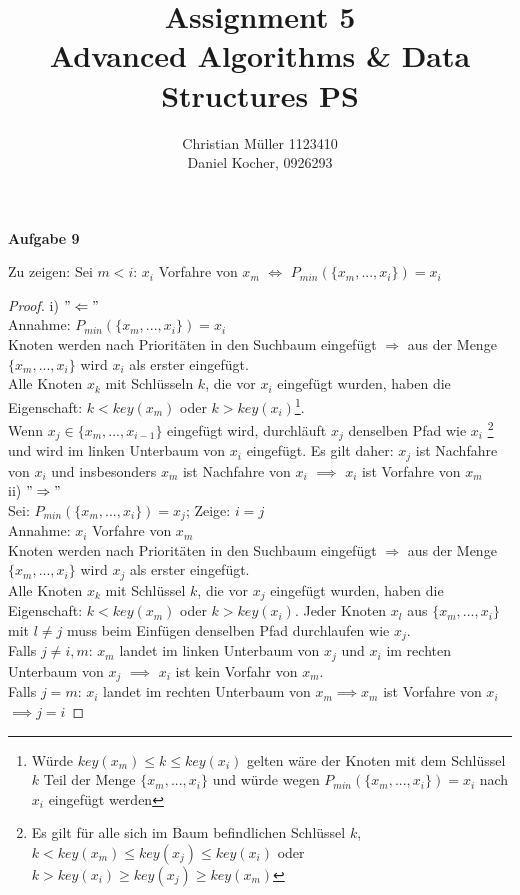 \documentclass{article}
\begin{document}
\title{Assignment 5 \\ Advanced Algorithms \& Data Structures PS}%
\author{Christian Müller 1123410 \\ Daniel Kocher, 0926293}%
\maketitle

{\noindent\bfseries Aufgabe 9}%
\medskip%

Zu zeigen: Sei $m < i$: $x_{i}$ Vorfahre von $x_{m}$ $\Leftrightarrow$ $P_{min}(\lbrace x_{m},...,x_{i} \rbrace)=x_{i}$ \\

\begin{proof}
\noindent

\noindent
i) $"\Leftarrow"$\\
Annahme: $P_{min}(\lbrace x_{m},...,x_{i} \rbrace)=x_{i}$\\
Knoten werden nach Prioritäten in den Suchbaum eingefügt $\Rightarrow$ aus der Menge $\lbrace x_{m},...,x_{i} \rbrace$ wird $x_{i}$ als erster eingefügt.\\
Alle Knoten $x_{k}$ mit Schlüsseln $k$, die vor $x_{i}$ eingefügt wurden, haben die Eigenschaft: $k < key(x_{m})$ oder $k > key(x_{i})$\footnote[1]{Würde $key(x_{m}) \leq k \leq key(x_{i})$ gelten wäre der Knoten mit dem Schlüssel $k$ Teil der Menge $\lbrace x_{m},...,x_{i} \rbrace$ und würde wegen $P_{min}(\lbrace x_{m},...,x_{i} \rbrace)=x_{i}$ nach $x_{i}$ eingefügt werden}.\\
Wenn $x_{j} \in \lbrace x_{m},...,x_{i-1} \rbrace$ eingefügt wird, durchläuft $x_{j}$ denselben Pfad wie $x_{i}$ \footnote[2]{Es gilt für alle sich im Baum befindlichen Schlüssel $k$, 
$k < key(x_{m}) \leq key(x_{j}) \leq key(x_{i})$  oder $k > key(x_{i}) \geq key(x_{j}) \geq key(x_{m})$ } und wird im linken Unterbaum von $x_{i}$ eingefügt.
Es gilt daher: $x_{j}$ ist Nachfahre von $x_{i}$ und insbesonders $x_{m}$ ist Nachfahre von $x_{i}$ $\implies$ $x_{i}$ ist Vorfahre von $x_{m}$\\

\noindent
ii) $"\Rightarrow"$\\
Sei: $P_{min}(\lbrace x_{m},...,x_{i} \rbrace)=x_{j}$; Zeige: $i=j$\\
Annahme: $x_{i}$ Vorfahre von $x_{m}$\\
Knoten werden nach Prioritäten in den Suchbaum eingefügt $\Rightarrow$ aus der Menge $\lbrace x_{m},...,x_{i} \rbrace$ wird $x_{j}$ als erster eingefügt.\\
Alle Knoten $x_{k}$ mit Schlüssel $k$, die vor $x_{j}$ eingefügt wurden, haben die Eigenschaft: $k < key(x_{m})$ oder $k > key(x_{i})$.
Jeder Knoten $x_{l}$ aus $\lbrace x_{m},...,x_{i} \rbrace$ mit $l \neq j$ muss beim Einfügen denselben Pfad durchlaufen wie $x_{j}$.\\
Falls $j \neq i,m$: $x_{m}$ landet im linken Unterbaum von $x_{j}$ und $x_{i}$ im rechten Unterbaum von $x_{j}$ $\implies$ $x_{i}$ ist kein Vorfahr von $x_{m}$.\\
Falls $j=m$: $x_{i}$ landet im rechten Unterbaum von $x_{m} \implies x_{m}$ ist Vorfahre von $x_{i}$\\
$\implies j=i$ 
\end{proof}
\end{document}
